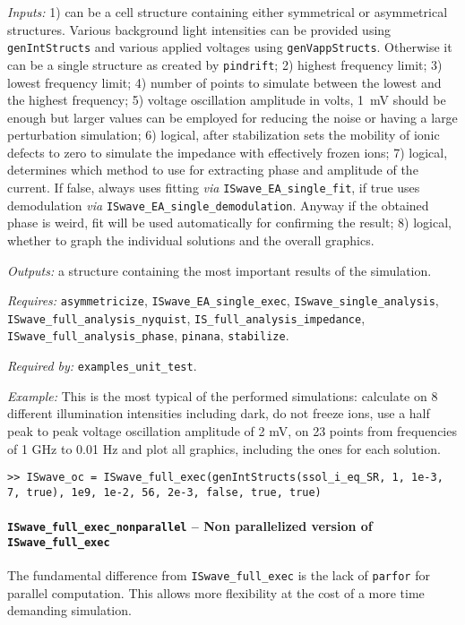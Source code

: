 	\textit{Inputs:} 1) can be a cell structure containing either symmetrical or asymmetrical structures. Various background
	light intensities can be provided using \texttt{gen\-Int\-Structs} and various applied voltages using \texttt{gen\-Vapp\-Structs}.
	Otherwise it can be a single structure as created by \texttt{pin\-drift};
	2) highest frequency limit;
	3) lowest frequency limit;
	4) number of points to simulate between the lowest and
	the highest frequency;
	5) voltage oscillation amplitude in volts, \SI{1}{\mV} should be enough but larger values can be employed for reducing the noise or having a large perturbation simulation;
	6) logical, after stabilization sets the mobility of
	ionic defects to zero to simulate the impedance with effectively frozen ions;
	7) logical, determines which method to use for extracting phase and amplitude of the current.
	If false, always uses fitting \textsl{via} \texttt{IS\-wave\_EA\_single\_fit}, if true uses demodulation \textsl{via} \texttt{IS\-wave\_EA\_single\_demodulation}. Anyway if the obtained phase is weird, fit will be used
	automatically for confirming the result;
	8) logical, whether to graph the individual solutions and
	the overall graphics.

	\textit{Outputs:} a structure containing the most important results of the simulation.

	\textit{Requires:} \texttt{asymmetricize}, \texttt{IS\-wave\_EA\_single\_exec},
	\texttt{IS\-wave\_single\_analysis}, \texttt{IS\-wave\_full\_analysis\_nyquist},
	\texttt{IS\_full\_analysis\_impedance}, \texttt{IS\-wave\_full\_analysis\_phase}, \texttt{pinana},
	\texttt{stabilize}.

	\textit{Required by:} \texttt{examples\_unit\_test}.

	\textit{Example:} This is the most typical of the performed simulations: calculate on 8 different illumination intensities including dark, do not freeze ions, use a half peak to peak
	voltage oscillation amplitude of 2 mV, on 23 points from frequencies of 1 GHz to
	0.01 Hz and plot all graphics, including the ones for each solution.
	\begin{lstlisting}[style=Matlab-editor]
>> ISwave_oc = ISwave_full_exec(genIntStructs(ssol_i_eq_SR, 1, 1e-3, 7, true), 1e9, 1e-2, 56, 2e-3, false, true, true)
\end{lstlisting}

	\paragraph{\texttt{IS\-wave\_full\_exec\_nonparallel} -- Non parallelized version of \texttt{IS\-wave\_full\_exec}}
	The fundamental difference from \texttt{IS\-wave\_full\_exec} is the lack of \texttt{parfor}
	for parallel computation. This allows more flexibility at the cost of a
	more time demanding simulation.


